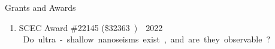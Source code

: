\begin{rSection}{Grants and Awards}
	\begin{enumerate}
		\item SCEC Award \#22145 (\$\SI{32363}) \hfill 2022\\
		Do ultra-shallow nanoseisms exist, and are they observable?
	\end{enumerate}
\end{rSection}
